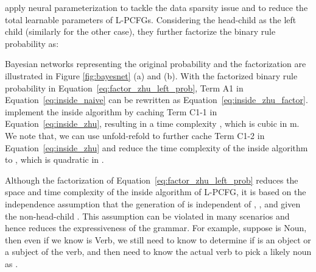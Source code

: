 \documentclass[11pt,a4paper]{article}
\begin{document}
\citet{zhu-etal-2020-return} apply neural parameterization to tackle the data sparsity issue and to reduce the total learnable parameters of L-PCFGs. Considering the head-child as the left child (similarly for the other case), they further factorize the binary rule probability as:



Bayesian networks representing the original probability and the factorization are illustrated in Figure \ref{fig:bayesnet} (a) and (b).
With the factorized binary rule probability in Equation~\ref{eq:factor_zhu_left_prob},
Term A1 in Equation~\ref{eq:inside_naive} can be rewritten as Equation~\ref{eq:inside_zhu_factor}.
\citet{zhu-etal-2020-return} implement the inside algorithm by caching Term C1-1 in Equation~\ref{eq:inside_zhu}, resulting in a time complexity , which is cubic in m.
We note that, 
we can use unfold-refold to further cache Term C1-2 in Equation~\ref{eq:inside_zhu} and reduce the time complexity of the inside algorithm to ,
which is quadratic in . 



Although the factorization of Equation~\ref{eq:factor_zhu_left_prob} reduces the space and time complexity of the inside algorithm of  L-PCFG, it is based on the independence assumption that the generation of  is independent of , ,  and  given the non-head-child .
This assumption can be violated in many scenarios and hence reduces the expressiveness of the grammar.
For example, suppose  is Noun, then even if we know  is Verb, we still need to know  to determine if  is an object or a subject of the verb, and then need to know the actual verb  to pick a likely noun as . 
\end{document}
